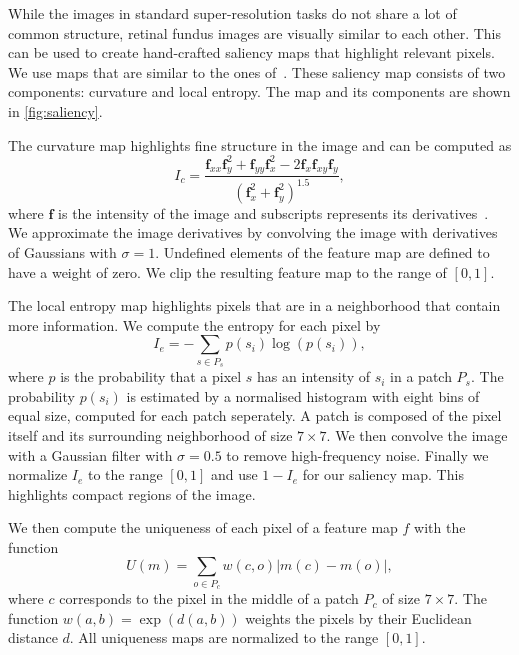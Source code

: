 \documentclass{scrartcl}
\newcommand{\img}{\bm{f}} %
\begin{document}
While the images in standard super-resolution tasks do not share a lot of common structure, retinal fundus images are visually similar to each other.
This can be used to create hand-crafted saliency maps that highlight relevant pixels.
We use maps that are similar to the ones of~\cite{SaliencyGAN}.
These saliency map consists of two components: curvature and local entropy.
The map and its components are shown in \cref{fig:saliency}.

The curvature map highlights fine structure in the image and can be computed as
\begin{equation}
 I_c = \frac{\img_{xx} \img_y^2 + \img_{yy} \img_x^2 - 2 \img_{x} \img_{xy} \img_{y} }{(\img_x^2 + \img_y^2)^{1.5}},
\end{equation}
where \(\img\) is the intensity of the image and subscripts represents its derivatives~\cite{SaliencyGAN}.
We approximate the image derivatives by convolving the image with derivatives of Gaussians with \(\sigma = 1\).
Undefined elements of the feature map are defined to have a weight of zero.
We clip the resulting feature map to the range of $[0,1]$.

The local entropy map highlights pixels that are in a neighborhood that contain more information.
We compute the entropy for each pixel by
\begin{equation}
  \label{eq:entr}
  I_e = - \sum_{s \in P_s} p(s_i) \log(p(s_i)),
\end{equation}
where \(p\) is the probability that a pixel \(s\) has an intensity of \(s_i\) in a patch \(P_s\).
The probability $p(s_i)$ is estimated by a normalised histogram with eight bins of equal size, computed for each patch seperately.
A patch is composed of the pixel itself and its surrounding neighborhood of size \(7 \times 7\).
We then convolve the image with a Gaussian filter with \(\sigma = 0.5\) to remove high-frequency noise.
Finally we normalize $I_e$ to the range \([0, 1]\) and use $1 - I_e$ for our saliency map.
This highlights compact regions of the image.

We then compute the uniqueness of each pixel of a feature map \(f\) with the function
\begin{equation}
  \label{eq:uniq}
  U(m) = \sum_{o \in P_c} w(c, o) \vert m(c) - m(o) \vert,
\end{equation}
where \(c\) corresponds to the pixel in the middle of a patch \(P_c\) of size \(7 \times 7\).
The function \(w(a,b) = \exp(d(a, b))\) weights the pixels by their Euclidean distance \(d\).
All uniqueness maps are normalized to the range \([0,1]\).
\end{document}
